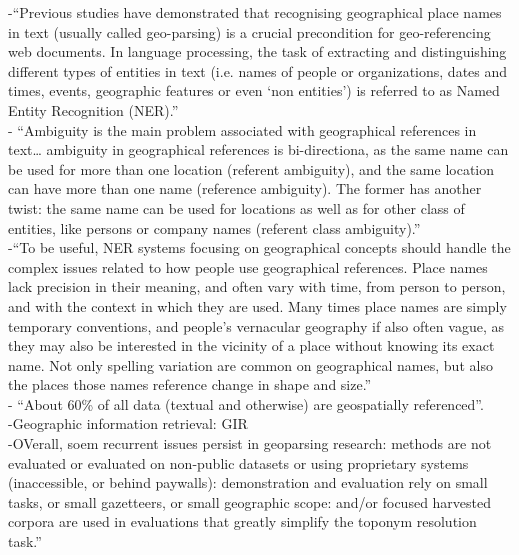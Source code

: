 -{\color{orange}“Previous studies have demonstrated that recognising geographical place names in text (usually called geo-parsing) is a crucial precondition for geo-referencing web documents. In language processing, the task of extracting and distinguishing different types of entities in text (i.e. names of people or organizations, dates and times, events, geographic features or even ‘non entities’) is referred to as Named Entity Recognition (NER).”\cite{Silva2006}}\\
-{\color{orange} “Ambiguity is the main problem associated with geographical references in text… ambiguity in geographical references is bi-directiona, as the same name can be used for more than one location (referent ambiguity), and the same location can have more than one name (reference ambiguity). The former has another twist: the same name can be used for locations as well as for other class of entities, like persons or company names (referent class ambiguity).”\cite{Silva2006}}\\
-{\color{orange}“To be useful, NER systems focusing on geographical concepts should handle the complex issues related to how people use geographical references. Place names lack precision in their meaning, and often vary with time, from person to person, and with the context in which they are used. Many times place names are simply temporary conventions, and people’s vernacular geography if also often vague, as they may also be interested in the vicinity of a place without knowing its exact name. Not only spelling variation are common on geographical names, but also the places those names reference change in shape and size.”\cite{Silva2006}}\\
-{\color{orange} “About 60\% of all data (textual and otherwise) are geospatially referenced”.\cite{Karimzadeh2019a}}\\
-{\color{orange}Geographic information retrieval: GIR\cite{Karimzadeh2019a}}\\
-{\color{orange}OVerall, soem recurrent issues persist in geoparsing research: methods are not evaluated or evaluated on non-public datasets or using proprietary systems (inaccessible, or behind paywalls): demonstration and evaluation rely on small tasks, or small gazetteers, or small geographic scope: and/or focused harvested corpora are used in evaluations that greatly simplify the toponym resolution task.”\cite{Karimzadeh2019a}}\\
